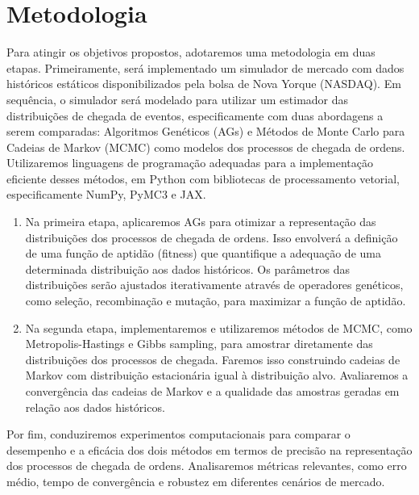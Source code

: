 \chapter{Metodologia}

Para atingir os objetivos propostos, adotaremos uma metodologia em duas etapas. Primeiramente, será implementado um simulador de mercado com dados históricos estáticos disponibilizados pela bolsa de Nova Yorque (NASDAQ). Em sequência, o simulador será modelado para utilizar um estimador das distribuições de chegada de eventos, especificamente com duas abordagens a serem comparadas: Algoritmos Genéticos (AGs) e Métodos de Monte Carlo para Cadeias de Markov (MCMC) como modelos dos processos de chegada de ordens. Utilizaremos linguagens de programação adequadas para a implementação eficiente desses métodos, em Python com bibliotecas de processamento vetorial, especificamente NumPy, PyMC3 e JAX.

\begin{enumerate}
	\item Na primeira etapa, aplicaremos AGs para otimizar a representação das distribuições dos processos de chegada de ordens. Isso envolverá a definição de uma função de aptidão (fitness) que quantifique a adequação de uma determinada distribuição aos dados históricos. Os parâmetros das distribuições serão ajustados iterativamente através de operadores genéticos, como seleção, recombinação e mutação, para maximizar a função de aptidão.
	
	\item Na segunda etapa, implementaremos e utilizaremos métodos de MCMC, como Metropolis-Hastings e Gibbs sampling, para amostrar diretamente das distribuições dos processos de chegada. Faremos isso construindo cadeias de Markov com distribuição estacionária igual à distribuição alvo. Avaliaremos a convergência das cadeias de Markov e a qualidade das amostras geradas em relação aos dados históricos.
\end{enumerate}

Por fim, conduziremos experimentos computacionais para comparar o desempenho e a eficácia dos dois métodos em termos de precisão na representação dos processos de chegada de ordens. Analisaremos métricas relevantes, como erro médio, tempo de convergência e robustez em diferentes cenários de mercado.